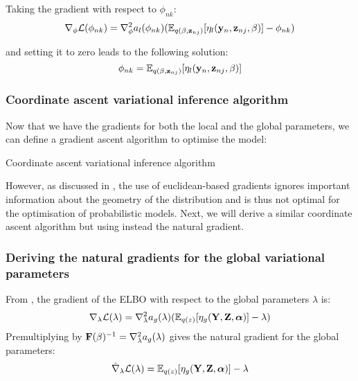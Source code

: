 Taking the gradient with respect to $\phi_{nk}$:
\begin{equation} \label{gradient_local}
	\nabla_{\phi} \mathcal{L}(\phi_{nk}) = \nabla_{\phi}^2 a_l(\phi_{nk}) (\mathbb{E}_{q(\beta,{\bf z}_{nj})}[\eta_l({\bf y}_n,{\bf z}_{nj},\beta)] - \phi_{nk})
\end{equation}

and setting it to zero leads to the following solution:
\begin{equation} \label{solution_local}
	\phi_{nk} = \mathbb{E}_{q(\beta,{\bf z}_{nj})}[\eta_l({\bf y}_{n},{\bf z}_{nj},\beta)]
\end{equation}


\subsubsection{Coordinate ascent variational inference algorithm}

Now that we have the gradients for both the local and the global parameters, we can define a gradient ascent algorithm to optimise the model:

\begin{algorithm}
  \caption{Coordinate ascent variational inference algorithm}
  \begin{algorithmic}[1]
	\State Initialise the global parameters $\blambda^{(t=0)}$
	\Repeat
			\State $ \phi_{nk}^{(t+1)} \gets \E_{q^{(t)}(q(\bbeta,\bfz_{nj}))[\eta_l(\bfy_{n},\bfz_{nj},\bbeta)] $
      	\EndFor
		\For{\text{each global variational parameter $\lambda$}}
			\State $ \lambda{(t+1)}= \E_{q^{(t)}(q(z))[\eta_g(\bfY,\bfZ,\balpha)] $
      	\EndFor
	\Until{Convergence}
	\end{algorithmic}
\end{algorithm}

However, as discussed in , the use of euclidean-based gradients ignores important information about the geometry of the distribution and is thus not optimal for the optimisation of probabilistic models. Next, we will derive a similar coordinate ascent algorithm but using instead the natural gradient.


\subsubsection{Deriving the natural gradients for the global variational parameters}

From , the gradient of the ELBO with respect to the global parameters $\lambda$ is:
\[
	\nabla_{\lambda} \mathcal{L}(\lambda) = \nabla_{\lambda}^{2} a_g(\lambda)(\mathbb{E}_{q(z)}[\eta_g({\bf Y},{\bf Z},\mbox{\boldmath $\alpha$})] - \lambda)
\]
Premultiplying by ${\bf F}(\beta)^{-1}=\nabla_{\lambda}^{2} a_g(\lambda)$ gives the natural gradient for the global parameters:
\[
	\hat{\nabla}_{\lambda} \mathcal{L}(\lambda) = \mathbb{E}_{q(z)}[\eta_g({\bf Y},{\bf Z},\mbox{\boldmath $\alpha$})] - \lambda
\]


